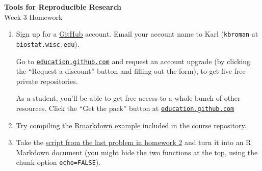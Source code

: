 \documentclass[12pt]{article}
\newcommand{\ttsm}{\tt \small}
\begin{document}
\thispagestyle{empty}

\textbf{Tools for Reproducible Research} \\
Week 3 Homework

\bigskip

\begin{enumerate}

\item Sign up for a \href{https://github.com}{GitHub} account. Email
  your account name to Karl ({\ttsm kbroman} at {\ttsm biostat.wisc.edu}).

  Go to
  \href{https://education.github.com}{\ttsm education.github.com} and
  request an account upgrade (by clicking the ``Request a discount''
  button and filling out the form), to get five free private repositories.

  As a student, you'll be able to get free access to a whole bunch of
  other resources. Click the ``Get the pack'' button at
  \href{https://education.github.com}{\ttsm education.github.com}

\item Try compiling the
  \href{https://raw.githubusercontent.com/kbroman/Tools4RR/master/03_KnitrMarkdown/Examples/example1.Rmd}{Rmarkdown example}
  included in the course repository.


\item Take the
  \href{http://kbroman.org/Tools4RR/assets/homework/02_homework.R}{script from
    the last problem in homework 2}
  and turn it into an R Markdown document (you might hide the two
  functions at the top, using the chunk option {\tt echo=FALSE}).

\end{enumerate}
\end{document}
